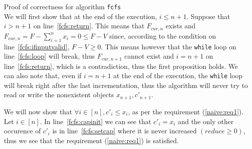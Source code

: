 \begin{sepproof}{Proof of correctness for algorithm \texttt{fcfs}} \ \\
   We will first show that at the end of the execution, $i \leq n+1$. Suppose that $i > n+1$ on line~\ref{fcfs:return}. This
   means that $F_{cur,n}$ exists and $F_{cur,n} = F - \sum\limits_{i=1}^{n}x_i = 0 \leq F - V$ since, according to the
   condition on line~\ref{fcfs:ifinputvalid}, $F - V \geq 0$. This means however that the \texttt{while} loop on
   line~\ref{fcfs:loop} will break, thus $F_{cur,n+1}$ cannot exist and $i = n + 1$ on line~\ref{fcfs:return}, which is a
   contradiction, thus the first proposition holds. We can also note that, even if $i = n + 1$ at the end of the execution,
   the \texttt{while} loop will break right after the last incrementation, thus the algorithm will never try to read or
   write the nonexistent objects $x_{n+1}, c'_{n+1}$.

   We will now show that $\forall i \in [n], c'_i \leq x_i$, as per the requirement (\ref{naive:req1}). Let $i \in [n]$.
   In line~\ref{fcfs:capinit} we can see that $c'_i = x_i$ and the only other occurence of $c'_i$ is in
   line~\ref{fcfs:setcap} where it is never increased $\left(reduce \geq 0\right)$, thus we see that the requirement
   (\ref{naive:req1}) is satisfied.


\end{sepproof}
